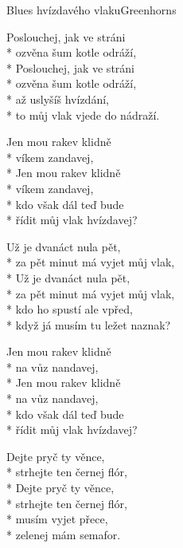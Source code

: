 \documentclass[10.5pt]{book}
\begin{document}
\begin{poem}{Blues hvízdavého vlaku}{Greenhorns}

\settowidth{\versewidth}{za pět minut má vyjet můj vlak,}

Poslouchej, jak ve stráni\\*
ozvěna šum kotle odráží,\\*
Poslouchej, jak ve stráni\\*
ozvěna šum kotle odráží,\\*
až uslyšíš hvízdání,\\*
to můj vlak vjede do nádraží.

Jen mou rakev klidně\\*
víkem zandavej,\\*
Jen mou rakev klidně\\*
víkem zandavej,\\*
kdo však dál teď bude\\*
řídit můj vlak hvízdavej?

Už je dvanáct nula pět,\\*
za pět minut má vyjet můj vlak,\\*
Už je dvanáct nula pět,\\*
za pět minut má vyjet můj vlak,\\*
kdo ho spustí ale vpřed,\\*
když já musím tu ležet naznak?

Jen mou rakev klidně\\*
na vůz nandavej,\\*
Jen mou rakev klidně\\*
na vůz nandavej,\\*
kdo však dál teď bude\\*
řídit můj vlak hvízdavej?

Dejte pryč ty věnce,\\*
strhejte ten černej flór,\\*
Dejte pryč ty věnce,\\*
strhejte ten černej flór,\\*
musím vyjet přece,\\*
zelenej mám semafor.

\end{poem}
\end{document}
